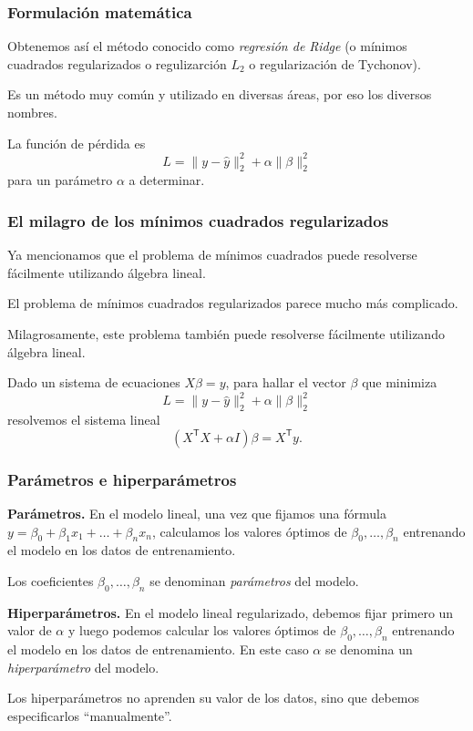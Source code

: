 \documentclass[aspectratio=169,12pt]{beamer}
\begin{document}
\begin{frame}
\frametitle{Formulación matemática}

Obtenemos así el método conocido como \emph{regresión de Ridge} (o mínimos cuadrados regularizados o regulizarción $L_2$ o regularización de Tychonov). 

Es un método muy común y utilizado en diversas áreas, por eso los diversos nombres.

La función de pérdida es 
$$
L = \|y - \hat y\|_2^2 + \alpha \|\beta\|_2^2
$$
para un parámetro $\alpha$ a determinar.

\end{frame}

\begin{frame}
\frametitle{El milagro de los mínimos cuadrados regularizados}

Ya mencionamos que el problema de mínimos cuadrados puede resolverse fácilmente utilizando álgebra lineal.

El problema de mínimos cuadrados regularizados parece mucho más complicado.

Milagrosamente, este problema también puede resolverse fácilmente  utilizando álgebra lineal.

Dado un sistema de ecuaciones $X \beta = y$, para hallar el vector $\beta$ que minimiza 
$$L = \|y - \hat y\|_2^2 + \alpha \|\beta\|_2^2$$ 
resolvemos el sistema lineal
$$
\left(X^{\mathsf {T}}X+ \alpha I\right) \beta = X^{\mathsf {T}}{y}.
$$

\end{frame}

\begin{frame}
\frametitle{Parámetros e hiperparámetros}

\textbf{Parámetros.} En el modelo lineal, una vez que fijamos una fórmula $y = \beta_0 + \beta_1 x_1 + \dots + \beta_n x_n$, calculamos los valores óptimos de $\beta_0, \dots, \beta_n$ entrenando el modelo en los datos de entrenamiento.

Los coeficientes $\beta_0, \dots, \beta_n$ se denominan \emph{parámetros} del modelo.

\textbf{Hiperparámetros.} En el modelo lineal regularizado, debemos fijar primero un valor de $\alpha$ y luego podemos calcular los valores óptimos de $\beta_0, \dots, \beta_n$ entrenando el modelo en los datos de entrenamiento. En este caso $\alpha$ se denomina un \emph{hiperparámetro} del modelo.

Los hiperparámetros no aprenden su valor de los datos, sino que debemos especificarlos ``manualmente''.
\end{frame}
\end{document}
